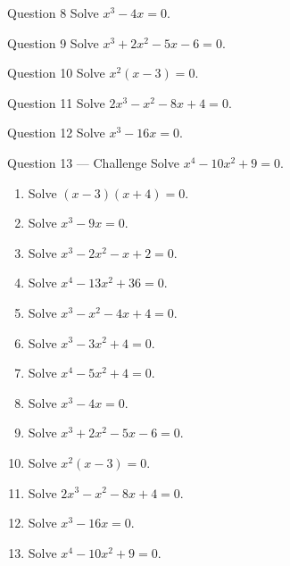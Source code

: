 \documentclass[11pt]{article}
\begin{document}
\begin{qbox}{Question 8}
Solve $x^3-4x=0$.\workspace{2.4cm}
\end{qbox}

\begin{qbox}{Question 9}
Solve $x^3+2x^2-5x-6=0$.\workspace{2.4cm}
\end{qbox}

\begin{qbox}{Question 10}
Solve $x^2(x-3)=0$.\workspace{2.4cm}
\end{qbox}

\begin{qbox}{Question 11}
Solve $2x^3-x^2-8x+4=0$.\workspace{2.4cm}
\end{qbox}

\begin{qbox}{Question 12}
Solve $x^3-16x=0$.\workspace{2.4cm}
\end{qbox}

\begin{qbox}{Question 13 --- Challenge}
Solve $x^4-10x^2+9=0$.\workspace{3cm}
\end{qbox}

\clearpage
{}

\begin{recapbox}
\begin{multicols}{2}
\small
\begin{enumerate}[leftmargin=*,itemsep=3pt]
  \item Solve $(x-3)(x+4)=0$.
  \item Solve $x^3-9x=0$.
  \item Solve $x^3-2x^2-x+2=0$.
  \item Solve $x^4-13x^2+36=0$.
  \item Solve $x^3-x^2-4x+4=0$.
  \item Solve $x^3-3x^2+4=0$.
  \item Solve $x^4-5x^2+4=0$.
  \item Solve $x^3-4x=0$.
  \item Solve $x^3+2x^2-5x-6=0$.
  \item Solve $x^2(x-3)=0$.
  \item Solve $2x^3-x^2-8x+4=0$.
  \item Solve $x^3-16x=0$.
  \item Solve $x^4-10x^2+9=0$.
\end{enumerate}
\end{multicols}
\end{recapbox}
\end{document}
